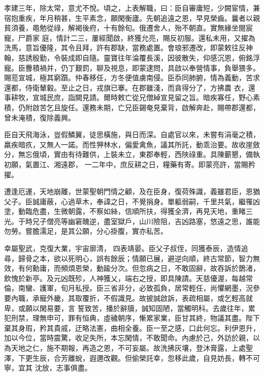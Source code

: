 \begin{pinyinscope}
 孝建三年，除太常，意尤不悅。頃之，上表解職，曰：臣自審庸短，少闕宦情，兼宿抱重疾，年月稍甚，生平素念，願閑衡廬。先朝追遠之恩，早見榮齒。曩者以親貧須養，黽勉從祿，解褐後府，十有餘旬。俄遷舍人，殆不朝直。實無緣坐閱宸寵，尸爵家
 庭，情計二三，屢經聞啟，終獲允亮，賜反初服。還私未用，又擢為洗馬，意旨優隆，其令且拜，許有郡缺，當務處置。會琅邪遷改，即蒙敕往反神翰，慈誘殷勤，令裝成即自隨。靈寶往年淪覆長溪，因彼散失，仰感沉恩，俯銘浮寵。臣釁積禍并，仍丁艱罰，聊及視息，即蒙逮問，具啟以奉營情事，負舉猥多。賜蒞宣城，極其窮躓。仲春移任，方冬便值虜南侵。臣忝同肺腑，情為義動，苦求還都，侍衛輦轂。至止之日，戎旗已搴。在郡雖淺，而貪得分了，方拂農
 衣，還事耕牧，宣城民庶，詣闕見請。爾時敕亡從兄僧綽宣見留之旨。暗疾寡任，野心素積，仍附啟苦乞且旋任。還務未期，亡兄臣錫奄見棄背，啟解奔赴，賜帶郡還都，曾未淹積，復除義興。



 臣自天飛海泳，豈假鱗翼，徒思橫施，與日而深。自處官以來，未嘗有涓毫之積，羸疾暗疚，又無人一諾。而性狎林水，偏愛禽魚，議其所託，動乖治要。故收崖斂分，無忘俄頃，實由有待難供，上裝未立，東郡奉輕，西陜祿重。具陳蘄懇，備執初願，氣置江、湘遠郡，
 一二年中，庶反耕之日，糧藥有寄。即蒙亮許，當賜矜擢。



 遭逢厄運，天地崩離，世蒙聖朝門情之顧，及在臣身，復荷殊識，義雖君臣，恩猶父子。臣誠庸蔽，心過草木，奉諱之日，不覺捐身。單軀弱嗣，千里共氣，繼罹凶塗，動臨危盡，生微朝露，不察如絲，信順所扶，得獲全濟，再見天地，重睹三光。于時兄子僧亮等幽窘醜逆，盡室獄戶，山川險阻，吉凶路塞，悠遠之思，誰能勿勞。嘗膽濡足，是其公願，分心掛腹，實亦私苦。



 幸屬聖武，克復大業，宇宙廓清，
 四表靖晏。臣父子叔侄，同獲泰辰，造情追尋，歸骨之本，欲以死明心，誤有餘辰；情願已展，避逆向順，終古常節，智力無效，有何勳庸，而頻煩恩榮，動踰分次。但忽病之日，不敢固辭，故吞訴於鵲渚，飲愧於新亭。及元凶既殄，人神獲乂，端右之授，即具陳請。天慈優渥，每越常倫，南蠻、護軍，旬月私授。臣三省非分，必致孤負，居常輕任，尚懼網墨，況參要內職，承寵外畿，其取覆折，不假識見。故披誠啟訴，表疏相屬，或乞輕高就卑，或願以閑易要，言
 誓致苦，播於辭牘，誠知固陋，當觸明科。去歲往年，累犯刑禁，理無申可，罪有恒典，虛穢朝序，慚累家業，臣甘其終，物議其盡。陛下棄其身瑕，矜其貴戚，迂略法憲，曲相全養。臣一至之感，口此何忘。利伊恩升，加以今位，當時震驚，收足失所，本忘閑情，不敢聞命。內慮於己，外訪於親，以為天地之仁，施不期報，再造之恩，不可妄屬。故洗拂灰壤，登沐膏露，上處聖澤，下更生辰，合芳離蛻，遐邇改觀。但偷榮託幸，忽移此歲，自見妨長，轉不可寧，宜其
 沈放，志事俱盡。




\end{pinyinscope}
